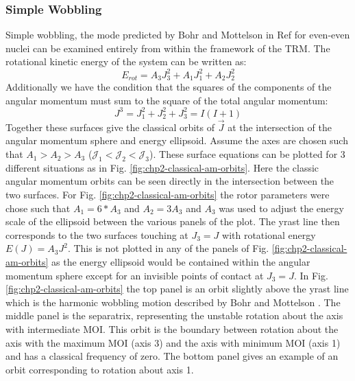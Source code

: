 \subsubsection{Simple Wobbling}
\label{sssec:models-wobbling-simple-wobbling}
Simple wobbling, the mode predicted by Bohr and Mottelson in Ref \cite{bohrMottelson2} for even-even nuclei can be examined entirely from within the framework of the TRM. The rotational kinetic energy of the system can be written as:
\begin{equation}
\label{eqn:chp2-rot-kin-en}
E_{rot} = A_3J_3^2 + A_1J_1^2 + A_2J_2^2
\end{equation}
Additionally we have the condition that the squares of the components of the angular momentum must sum to the square of the total angular momentum:
\begin{equation}
\label{eqn:chp2-am-cons}
J^3 = J_1^2 + J_2^2 + J_3^2 = I(I+1)
\end{equation}
Together these surfaces give the classical orbits of $\vec{J}$ at the intersection of the angular momentum sphere and energy ellipsoid. Assume the axes are chosen such that $A_1>A_2>A_3$ ($\mathcal{J}_1<\mathcal{J}_2<\mathcal{J}_3$). These surface equations can be plotted for 3 different situations as in Fig. \ref{fig:chp2-classical-am-orbits}. Here the classic angular momentum orbits can be seen directly in the intersection between the two surfaces. For Fig. \ref{fig:chp2-classical-am-orbits} the rotor parameters were chose such that $A_1=6*A_3$ and $A_2=3A_3$ and $A_3$ was used to adjust the energy scale of the ellipsoid between the various panels of the plot. The yrast line then corresponds to the two surfaces touching at $J_3=J$ with rotational energy $E(J)=A_3J^2$. This is not plotted in any of the panels of Fig. \ref{fig:chp2-classical-am-orbits} as the energy ellipsoid would be contained within the angular momentum sphere except for an invisible points of contact at $J_3=J$. In Fig. \ref{fig:chp2-classical-am-orbits} the top panel is an orbit slightly above the yrast line which is the harmonic wobbling motion described by Bohr and Mottelson \cite{bohrMottelson2}. The middle panel is the separatrix, representing the unstable rotation about the axis with intermediate MOI. This orbit is the boundary between rotation about the axis with the maximum MOI (axis 3) and the axis with minimum MOI (axis 1) and has a classical frequency of zero. The bottom panel gives an example of an orbit corresponding to rotation about axis 1.
